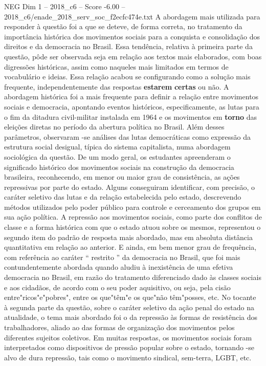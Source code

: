 \begin{textsample}{NEG Dim 1 – 2018\_c6 – Score -6.00 – 2018\_c6/enade\_2018\_serv\_soc\_f2ecfc474e.txt}
A abordagem mais utilizada para responder à questão foi a que se deteve, de forma correta, no tratamento da importância histórica dos movimentos sociais para a conquista e consolidação dos direitos e da democracia no Brasil.
Essa tendência, relativa à primeira parte da questão, pôde ser observada seja em relação aos textos mais elaborados, com boas digressões históricas, assim como naqueles mais limitados em termos de vocabulário e ideias.
Essa relação acabou se configurando como a solução mais frequente, independentemente das respostas \textbf{estarem} \textbf{certas} ou não.
A abordagem histórica foi a mais frequente para definir a relação entre movimentos sociais e democracia, apontando eventos históricos, especificamente, as lutas para o fim da ditadura civil-militar instalada em 1964 e os movimentos em \textbf{torno} das eleições diretas no período da abertura política no Brasil.
Além desses parâmetros, observaram -se análises das lutas democráticas como expressão da estrutura social desigual, típica do sistema capitalista, numa abordagem sociológica da questão.
De um modo geral, os estudantes apreenderam o significado histórico dos movimentos sociais na construção da democracia brasileira, reconhecendo, em menor ou maior grau de consistência, as ações repressivas por parte do estado.
Alguns conseguiram identificar, com precisão, o caráter seletivo das lutas e da relação estabelecida pelo estado, descrevendo métodos utilizados pelo poder público para controle e cerceamento dos grupos em sua ação política.
A repressão aos movimentos sociais, como parte dos conflitos de classe e a forma histórica com que o estado atuou sobre os mesmos, representou o segundo item do padrão de resposta mais abordado, mas em absoluta distância quantitativa em relação ao anterior.
E ainda, em bem menor grau de frequência, com referência ao caráter “ restrito ” da democracia no Brasil, que foi mais contundentemente abordada quando aludiu à inexistência de uma efetiva democracia no Brasil, em razão do tratamento diferenciado dado às classes sociais e aos cidadãos, de acordo com o seu poder aquisitivo, ou seja, pela cisão entre"ricos"e"pobres", entre os que"têm"e os que"não têm"posses, etc.
No tocante à segunda parte da questão, sobre o caráter seletivo da ação penal do estado na atualidade, o tema mais abordado foi o da repressão às formas de resistência dos trabalhadores, aliado ao das formas de organização dos movimentos pelos diferentes sujeitos coletivos.
Em muitas respostas, os movimentos sociais foram interpretados como dispositivos de pressão popular sobre o estado, tornando -se alvo de dura repressão, tais como o movimento sindical, sem-terra, LGBT, etc.

\end{textsample}

